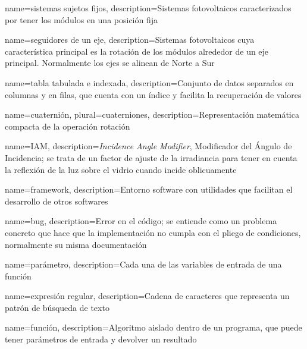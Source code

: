 {
    name={sistemas sujetos fijos},
    description={Sistemas fotovoltaicos caracterizados por tener los módulos en una posición fija}
}

{
    name={seguidores de un eje},
    description={Sistemas fotovoltaicos cuya característica principal es la rotación de los módulos alrededor de un eje principal. Normalmente los ejes se alinean de Norte a Sur}
}

{
    name={tabla tabulada e indexada},
    description={Conjunto de datos separados en columnas y en filas, que cuenta con un índice y facilita la recuperación de valores}
}

{
    name={cuaternión},
    plural={cuaterniones},
    description={Representación matemática compacta de la operación rotación}
}

{
    name={IAM},
    description={\textit{Incidence Angle Modifier}, Modificador del Ángulo de Incidencia; se trata de un factor de ajuste de la irradiancia para tener en cuenta la reflexión de la luz sobre el vidrio cuando incide oblicuamente}
}

{
    name={framework},
    description={Entorno \gls{software} con utilidades que facilitan el desarrollo de otros softwares}
}

{
    name={bug},
    description={Error en el código; se entiende como un problema concreto que hace que la implementación no cumpla con el pliego de condiciones, normalmente su misma \gls{documentación}}
}

{
    name={parámetro},
    description={Cada una de las variables de entrada de una función}
}

{
    name={expresión regular},
    description={Cadena de caracteres que representa un patrón de búsqueda de texto}
}

{
    name={función},
    description={Algoritmo aislado dentro de un programa, que puede tener parámetros de entrada y devolver un resultado}
}




